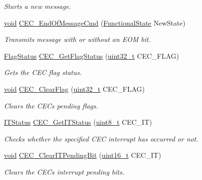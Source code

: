 \begin{DoxyCompactItemize}
\begin{DoxyCompactList}\small\item\em Starts a new message. \end{DoxyCompactList}\item 
\hyperlink{usb__devapi_8h_afabf60e7f57651d6d595a02c75f07cd0}{void} \hyperlink{group___c_e_c___private___functions_ga1e2cf6e3a1ac891f2814f9d3f4043574}{C\+E\+C\+\_\+\+End\+Of\+Message\+Cmd} (\hyperlink{agilefox_2library_2inc_2stm32f10x__type_8h_ac9a7e9a35d2513ec15c3b537aaa4fba1}{Functional\+State} New\+State)
\begin{DoxyCompactList}\small\item\em Transmits message with or without an E\+OM bit. \end{DoxyCompactList}\item 
\hyperlink{agilefox_2library_2inc_2stm32f10x__type_8h_a89136caac2e14c55151f527ac02daaff}{Flag\+Status} \hyperlink{group___c_e_c___private___functions_gaf920706cb350182bf0728c66868053ca}{C\+E\+C\+\_\+\+Get\+Flag\+Status} (\hyperlink{_p_e___types_8h_a33594304e786b158f3fb30289278f5af}{uint32\+\_\+t} C\+E\+C\+\_\+\+F\+L\+AG)
\begin{DoxyCompactList}\small\item\em Gets the C\+EC flag status. \end{DoxyCompactList}\item 
\hyperlink{usb__devapi_8h_afabf60e7f57651d6d595a02c75f07cd0}{void} \hyperlink{group___c_e_c___private___functions_ga928b373fb5972204c56f9c64113f8c67}{C\+E\+C\+\_\+\+Clear\+Flag} (\hyperlink{_p_e___types_8h_a33594304e786b158f3fb30289278f5af}{uint32\+\_\+t} C\+E\+C\+\_\+\+F\+L\+AG)
\begin{DoxyCompactList}\small\item\em Clears the C\+EC\textquotesingle{}s pending flags. \end{DoxyCompactList}\item 
\hyperlink{agilefox_2library_2inc_2stm32f10x__type_8h_aacbd7ed539db0aacd973a0f6eca34074}{I\+T\+Status} \hyperlink{group___c_e_c___private___functions_gaa1940a388d0bfcefe7483fb74cc2ba1d}{C\+E\+C\+\_\+\+Get\+I\+T\+Status} (\hyperlink{_p_e___types_8h_aba7bc1797add20fe3efdf37ced1182c5}{uint8\+\_\+t} C\+E\+C\+\_\+\+IT)
\begin{DoxyCompactList}\small\item\em Checks whether the specified C\+EC interrupt has occurred or not. \end{DoxyCompactList}\item 
\hyperlink{usb__devapi_8h_afabf60e7f57651d6d595a02c75f07cd0}{void} \hyperlink{group___c_e_c___private___functions_gade646921262a077172c708953822f248}{C\+E\+C\+\_\+\+Clear\+I\+T\+Pending\+Bit} (\hyperlink{_p_e___types_8h_a1f1825b69244eb3ad2c7165ddc99c956}{uint16\+\_\+t} C\+E\+C\+\_\+\+IT)
\begin{DoxyCompactList}\small\item\em Clears the C\+EC\textquotesingle{}s interrupt pending bits. \end{DoxyCompactList}\end{DoxyCompactItemize}


